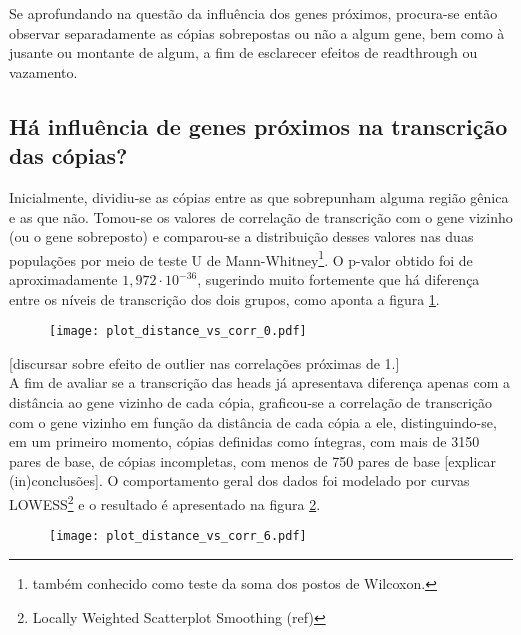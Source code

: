 \documentclass{article}
\begin{document}
\begin{multicols}{2}
Se aprofundando na questão da influência dos genes próximos, procura-se então observar separadamente as cópias sobrepostas ou não a algum gene, bem como à jusante ou montante de algum, a fim de esclarecer efeitos de readthrough ou vazamento.


\subsection{Há influência de genes próximos na transcrição das cópias?}

Inicialmente, dividiu-se as cópias entre as que sobrepunham alguma região gênica e as que não. Tomou-se os valores de correlação de transcrição com o gene vizinho (ou o gene sobreposto) e comparou-se a distribuição desses valores nas duas populações por meio de teste U de Mann-Whitney\footnote{também conhecido como teste da soma dos postos de Wilcoxon.}. O p-valor obtido foi de aproximadamente \(1,972 \cdot 10^{-36}\), sugerindo muito fortemente que há diferença entre os níveis de transcrição dos dois grupos, como aponta a figura \ref{histintegridade}.

\begin{figure}[H]
	\centering
	\label{histintegridade}
	\texttt{[image: plot\_distance\_vs\_corr\_0.pdf]}
\end{figure}

[discursar sobre efeito de outlier nas correlações próximas de 1.]\\


A fim de avaliar se a transcrição das heads já apresentava diferença apenas com a distância ao gene vizinho de cada cópia, graficou-se a correlação de transcrição com o gene vizinho em função da distância de cada cópia a ele, distinguindo-se, em um primeiro momento, cópias definidas como íntegras, com mais de 3150 pares de base, de cópias incompletas, com menos de 750 pares de base [explicar (in)conclusões]. O comportamento geral dos dados foi modelado por curvas LOWESS\footnote{Locally Weighted Scatterplot Smoothing (ref)} e o resultado é apresentado na figura \ref{completude}.

\begin{figure}[H]
	\centering
	\label{completude}
	\texttt{[image: plot\_distance\_vs\_corr\_6.pdf]}
\end{figure}


\end{multicols}
\end{document}
